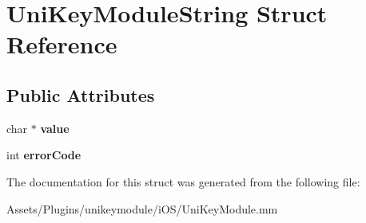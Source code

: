 \hypertarget{struct_uni_key_module_string}{}\section{Uni\+Key\+Module\+String Struct Reference}
\label{struct_uni_key_module_string}
\subsection*{Public Attributes}
\begin{DoxyCompactItemize}
\item 
\mbox{\label{struct_uni_key_module_string_aec198910aabea29a9ca400778423cf5f}} 
char $\ast$ {\bfseries value}
\item 
\mbox{\label{struct_uni_key_module_string_a1e5a8b52fb256362d7f5b3655d964e4c}} 
int {\bfseries error\+Code}
\end{DoxyCompactItemize}


The documentation for this struct was generated from the following file\+:\begin{DoxyCompactItemize}
\item 
Assets/\+Plugins/unikeymodule/i\+O\+S/Uni\+Key\+Module.\+mm\end{DoxyCompactItemize}
